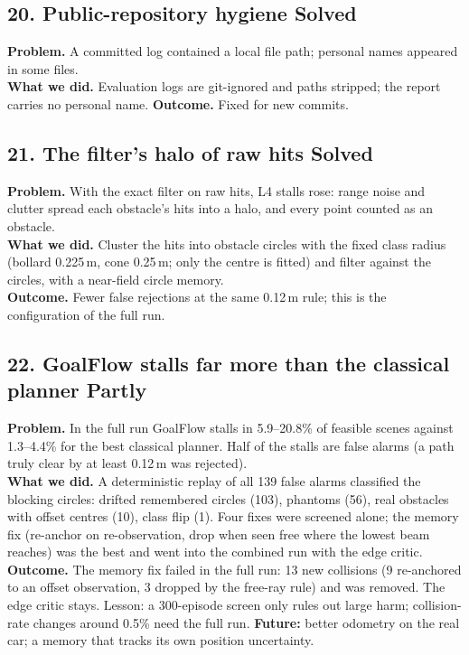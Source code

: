 \documentclass[11pt,a4paper]{article}
\newcommand{\solved}{\textcolor{okc}{\textbf{Solved}}}
\newcommand{\partly}{\textcolor{accent}{\textbf{Partly}}}
\begin{document}
\subsection*{20. Public-repository hygiene \hfill\solved}
\textbf{Problem.} A committed log contained a local file path; personal names appeared in some files.\\
\textbf{What we did.} Evaluation logs are git-ignored and paths stripped; the report carries no personal name.
\textbf{Outcome.} Fixed for new commits.

\subsection*{21. The filter's halo of raw hits \hfill\solved}
\textbf{Problem.} With the exact filter on raw hits, L4 stalls rose: range noise and clutter spread each obstacle's
hits into a halo, and every point counted as an obstacle.\\
\textbf{What we did.} Cluster the hits into obstacle circles with the fixed class radius (bollard 0.225\,m, cone
0.25\,m; only the centre is fitted) and filter against the circles, with a near-field circle memory.\\
\textbf{Outcome.} Fewer false rejections at the same 0.12\,m rule; this is the configuration of the full run.

\subsection*{22. GoalFlow stalls far more than the classical planner \hfill\partly}
\textbf{Problem.} In the full run GoalFlow stalls in 5.9--20.8\% of feasible scenes against 1.3--4.4\% for the best
classical planner. Half of the stalls are false alarms (a path truly clear by at least 0.12\,m was rejected).\\
\textbf{What we did.} A deterministic replay of all 139 false alarms classified the blocking circles: drifted
remembered circles (103), phantoms (56), real obstacles with offset centres (10), class flip (1). Four fixes were
screened alone; the memory fix (re-anchor on re-observation, drop when seen free where the lowest beam reaches)
was the best and went into the combined run with the edge critic.\\
\textbf{Outcome.} The memory fix failed in the full run: 13 new collisions (9 re-anchored to an offset observation,
3 dropped by the free-ray rule) and was removed. The edge critic stays. Lesson: a 300-episode screen only rules out
large harm; collision-rate changes around 0.5\% need the full run. \textbf{Future:} better odometry on the real car;
a memory that tracks its own position uncertainty.
\end{document}
